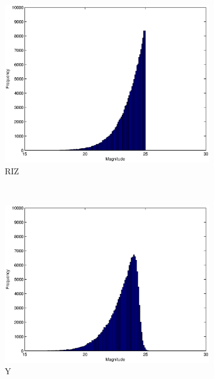 \documentclass[useAMS,usenatbib,fleqn]{mn2e}
\begin{document}
\begin{figure}
        \begin{subfigure}[b]{0.15\textwidth}
                \includegraphics[width=\columnwidth]{figures/RIZ.eps}
                \caption{RIZ}
        \end{subfigure}
        ~
        \begin{subfigure}[b]{0.15\textwidth}
                \includegraphics[width=\columnwidth]{figures/Y.eps}
                \caption{Y}
        \end{subfigure}
         ~
        \begin{subfigure}[b]{0.15\textwidth}

\end{subfigure}
\end{figure}
\end{document}
